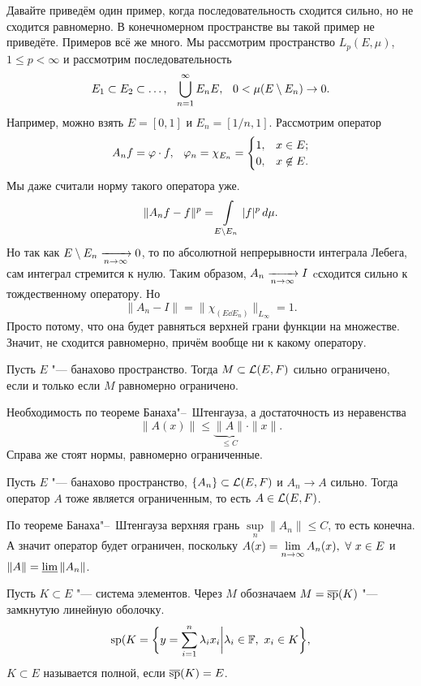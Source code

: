 Давайте приведём один пример, когда последовательность сходится сильно, но не сходится равномерно. В конечномерном пространстве вы такой пример не приведёте. Примеров всё же много. Мы рассмотрим пространство $L_p(E,\mu)$, $1\le p <\infty$ и рассмотрим последовательность 
\[
  E_1\subset E_2\subset \dots,\pau \uN n1E_n  E,\pau 0<\mu(E\dd E_n)\to0.
\]
Например, можно взять $E = [0,1]$ и $E_n = [1/n,1]$. Рассмотрим оператор
\[
  A_nf = \varphi \cdot f,\hskip .75em plus.1em minus.08em\relax \varphi_n = \chi_{E_n} = \begin{cases}1,&x\in E;\\0,&x\not\in E.\end{cases}
\]
Мы даже считали норму такого оператора уже.
\[
  \|A_nf - f\|^p = \int\limits_{E\setminus E_n}|f|^p\,d\mu.
\]
Но так как $E\setminus E_n\xrightarrow[n\rightarrow\infty]{} 0$, то по абсолютной непрерывности интеграла Лебега, сам интеграл стремится к нулю. Таким образом, $A_n\xrightarrow[n\rightarrow\infty]{} I$ cсходится сильно к тождественному оператору. Но
\[
  \|A_n-I\| = \|\chi_{(E\dd E_n)}\|_{L_\infty} = 1.
\]
Просто потому, что она будет равняться верхней грани функции на множестве. Значит, не сходится равномерно, причём вообще ни к какому оператору.

\begin{Ut}
  Пусть $E$ "--- банахово пространство. Тогда $M\subset \mathcal L(E,F)$ сильно ограничено, если и только если $M$ равномерно ограничено.
\end{Ut}
\begin{Proof}
  Необходимость по теореме Банаха"--~Штенгауза, а достаточность из неравенства
\[
  \big\|A(x)\|\le \underbrace{\|A\|}_{\le C}\cdot \|x\|.
\]
Справа же стоят нормы, равномерно ограниченные.
\end{Proof}
\begin{Lem}
 Пусть $E$ "--- банахово пространство, $\{A_n\}\subset\mathcal L(E,F)$ и $A_n\to A$ сильно. Тогда оператор $A$ тоже является ограниченным, то есть $A\in\mathcal L(E,F)$.
\end{Lem}
\begin{Proof}
 По теореме Банаха"--~Штенгауза верхняя грань $\sup\limits_n \|A_n\| \le C$, то есть конечна. А значит оператор будет ограничен, поскольку $A(x) = \lim\limits_{n\rightarrow\infty} A_n(x),\ \forall\ x\in E$ и $\|A\| = \varliminf \|A_n\|$.
\end{Proof}

\begin{Def}
  Пусть $K\subset E$ "--- система элементов. Через $M$ обозначаем $M = \overline{\operatorname{sp}}(K)$ "--- замкнутую линейную оболочку.
\[
\operatorname{sp}(K = \bigg\{ y = \sum\limits_{i = 1}^{n}\lambda_i x_i\bigg|\lambda_i\in \mathbb F,\ x_i\in K\bigg\},
\]
$K\subset E$ называется полной, если $\overline{\operatorname{sp}}(K)=E$.
\end{Def}

